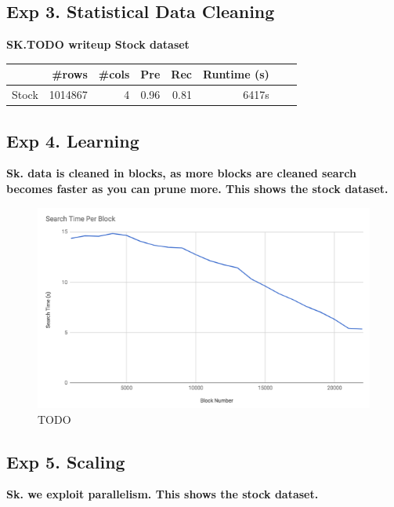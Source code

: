 \subsection*{Exp 3. Statistical Data Cleaning}

\textbf{SK.TODO writeup Stock dataset}


\begin{table}[ht]
\centering
\begin{tabular}{|l|r|r|r|r|r|r|r|}
\hline
 & \#rows & \#cols & Pre & Rec & Runtime (s) \\
\hline
Stock	&1014867&4& 0.96&	0.81&	6417s\\
\hline
\end{tabular}
\end{table}


\subsection*{Exp 4. Learning}
\textbf{Sk. data is cleaned in blocks, as more blocks are cleaned search becomes faster as you can prune more. This shows the stock dataset.}

 \begin{figure}[ht]
\centering
 \includegraphics[width=0.9\columnwidth]{figures/draft-blocks.png}
 \caption{TODO
 \label{fig:opt}}
\end{figure}


\subsection*{Exp 5. Scaling}
\textbf{Sk. we exploit parallelism. This shows the stock dataset.}

